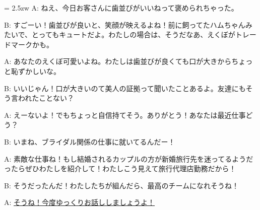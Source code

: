 \documentclass[11pt]{amsart}
\title{}
\author{}
\newenvironment{hangall}[1]{\hangindent = 2.5zw\everypar{\hangindent = 2.5zw}}{}
\begin{document}
\maketitle
\begin{hangall}{}%
A: ねえ、今日お客さんに歯並びがいいねって褒められちゃった。

B: すごーい！歯並びが良いと、笑顔が映えるよね！前に飼ってたハムちゃんみたいで、とってもキュートだよ。わたしの場合は、そうだなあ、えくぼがトレードマークかも。

A: あなたのえくぼ可愛いよね。わたしは歯並びが良くても口が大きからちょっと恥ずかしいな。

B: いいじゃん！口が大きいのて美人の証拠って聞いたことあるよ。友達にもそう言われたことない？

A: えーないよ！でもちょっと自信持てそう。ありがとう！あなたは最近仕事どう？

B: いまね、ブライダル関係の仕事に就いてるんだー！

A: 素敵な仕事ね！もし結婚されるカップルの方が新婚旅行先を迷ってるようだったらぜひわたしを紹介して！わたしこう見えて旅行代理店勤務だから！

B: そうだったんだ！わたしたちが組んだら、最高のチームになれそうね！

A: \ul{そうね！今度ゆっくりお話ししましょうよ！}\end{hangall}
\end{document}
